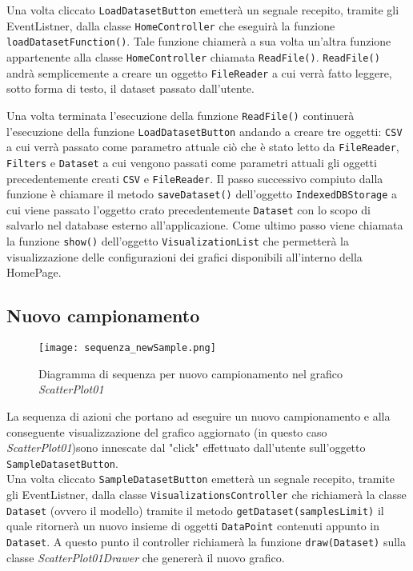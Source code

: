 Una volta cliccato \texttt{LoadDatasetButton} emetterà un segnale recepito, tramite gli EventListner, dalla classe \texttt{HomeController} che eseguirà la funzione\\ \texttt{loadDatasetFunction()}. Tale funzione chiamerà a sua volta un'altra funzione appartenente alla classe \texttt{HomeController} chiamata \texttt{ReadFile()}.
\texttt{ReadFile()} andrà semplicemente a creare un oggetto \texttt{FileReader} a cui verrà fatto leggere, sotto forma di testo, il dataset passato dall'utente.

Una volta terminata l'esecuzione della funzione \texttt{ReadFile()} continuerà l'esecuzione della funzione \texttt{LoadDatasetButton} andando a creare tre oggetti:
\texttt{CSV} a cui verrà passato come parametro attuale ciò che è stato letto da \texttt{FileReader}, \texttt{Filters} e \texttt{Dataset} a cui vengono passati come parametri attuali gli oggetti precedentemente creati \texttt{CSV} e \texttt{FileReader}.
Il passo successivo compiuto dalla funzione è chiamare il metodo \texttt{saveDataset()} dell'oggetto \texttt{IndexedDBStorage} a cui viene passato l'oggetto crato precedentemente \texttt{Dataset} con lo scopo di salvarlo nel database esterno all'applicazione.
Come ultimo passo viene chiamata la funzione \texttt{show()} dell'oggetto \texttt{VisualizationList} che permetterà la visualizzazione delle configurazioni dei grafici disponibili all'interno della HomePage.

\subsection{Nuovo campionamento}
\begin{figure}[H]
    \texttt{[image: sequenza\_newSample.png]}
    \caption{Diagramma di sequenza per nuovo campionamento nel grafico \textit{ScatterPlot01}}
\end{figure}
La sequenza di azioni che portano ad eseguire un nuovo campionamento e alla conseguente visualizzazione del grafico aggiornato (in questo caso \textit{ScatterPlot01})sono innescate dal "click" effettuato dall'utente sull'oggetto \texttt{SampleDatasetButton}.\\
Una volta cliccato \texttt{SampleDatasetButton} emetterà un segnale recepito, tramite gli EventListner, dalla classe \texttt{VisualizationsController} che richiamerà la classe \texttt{Dataset} (ovvero il modello) tramite il metodo \texttt{getDataset(samplesLimit)} il quale ritornerà un nuovo insieme di oggetti \texttt{DataPoint} contenuti appunto in \texttt{Dataset}. A questo punto il controller richiamerà la funzione \texttt{draw(Dataset)} sulla classe \textit{ScatterPlot01Drawer} che genererà il nuovo grafico.


